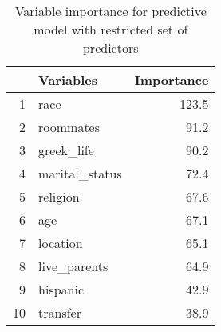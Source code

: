 \begin{table}[ht]
\centering
\begin{tabular}{rlr}
  \hline
 & Variables & Importance \\ 
  \hline
1 & race & 123.5 \\ 
  2 & roommates & 91.2 \\ 
  3 & greek\_life & 90.2 \\ 
  4 & marital\_status & 72.4 \\ 
  5 & religion & 67.6 \\ 
  6 & age & 67.1 \\ 
  7 & location & 65.1 \\ 
  8 & live\_parents & 64.9 \\ 
  9 & hispanic & 42.9 \\ 
  10 & transfer & 38.9 \\ 
   \hline
\end{tabular}
\caption{Variable importance for predictive model with restricted set of predictors} 
\end{table}
